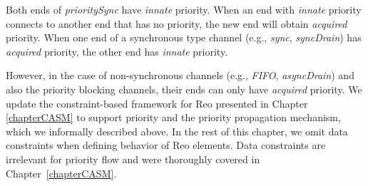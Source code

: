 %
%
%
%
%
   
Both ends of \emph{prioritySync} have \emph{innate} priority. When an end with \emph{innate} priority connects to another end that has no priority, the new end will obtain \emph{acquired} priority. When one end of a synchronous type channel (e.g., \emph{sync}, \emph{syncDrain}) has \emph{acquired} priority, the other end has \emph{innate} priority. 
 
However, in the case of non-synchronous channels (e.g., \emph{FIFO}, \emph{asyncDrain}) and also the priority blocking channels, their ends can only have \emph{acquired} priority. We update the constraint-based framework for Reo presented in Chapter \ref{chapterCASM} to support priority and the priority propagation mechanism, which we informally described above. 
In the rest of this chapter, we omit data constraints when defining behavior of Reo elements. Data constraints are irrelevant for priority flow and were thoroughly covered in Chapter~\ref{chapterCASM}.

